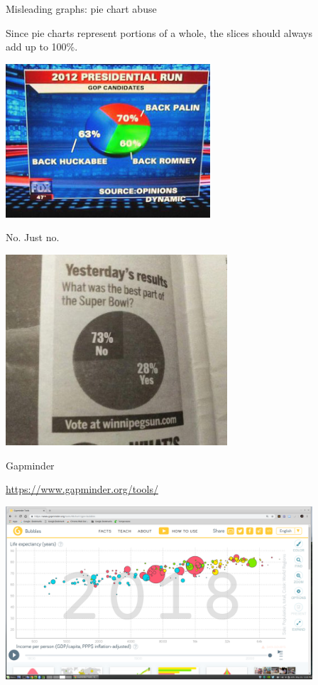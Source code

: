 \documentclass[xcolor=table, aspectratio=169, bigger]{beamer}
\begin{document}
\begin{frame}{Misleading graphs: pie chart abuse}
\begin{block}{}
Since pie charts represent portions of a whole, the slices should always\\ add up to 100\%.
\end{block}
\pause
\begin{center}
\includegraphics[width=3in]{../images/wk04_bad_piechart}
\end{center}

\end{frame}

\begin{frame}{No. Just no.}
\begin{center}
\includegraphics[width=3.25in]{../images/wk04_sb_piechart}
\end{center}
\end{frame}

\begin{frame}{Gapminder}

\url{https://www.gapminder.org/tools/}

\begin{center}
\includegraphics[width=4.5in]{../images/wk04_gapminder}
\end{center}


\end{frame}
\end{document}
